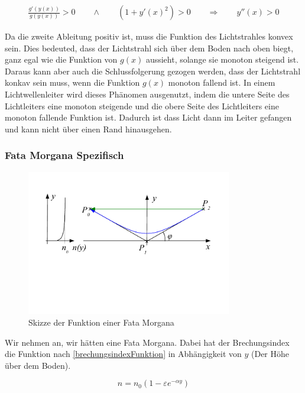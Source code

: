 \begin{align}
\frac{g'(y(x))}{g(y(x))} > 0 \qquad \wedge \qquad (1 + y'(x)^2) > 0 \qquad \Rightarrow \qquad y''(x) > 0
\end{align}

Da die zweite Ableitung positiv ist, muss die Funktion des Lichtstrahles konvex sein.
Dies bedeuted, dass der Lichtstrahl sich über dem Boden nach oben biegt, 
ganz egal wie die Funktion von $g(x)$ aussieht, solange sie monoton steigend ist.
Daraus kann aber auch die Schlussfolgerung gezogen werden, dass der Lichtstrahl konkav sein muss, 
wenn die Funktion $g(x)$ monoton fallend ist. 
In einem Lichtwellenleiter wird dieses Phänomen ausgenutzt, indem die untere Seite des Lichtleiters eine monoton steigende
und die obere Seite des Lichtleiters eine monoton fallende Funktion ist. 
Dadurch ist dass Licht dann im Leiter gefangen und kann nicht über einen Rand hinausgehen.

\subsubsection{Fata Morgana Spezifisch}

\begin{figure}[H]
	\includegraphics[width=0.8\textwidth]{./picture/FataMorgana.pdf}
	\caption{Skizze der Funktion einer Fata Morgana}
	\label{Ab:fata}
\end{figure}


Wir nehmen an, wir hätten eine Fata Morgana. 
Dabei hat der Brechungsindex die Funktion nach \eqref{brechungsindexFunktion} in Abhängigkeit von $y$ 
(Der Höhe über dem Boden).

\begin{equation}
	n = n_0 (1 - \varepsilon e^{- \alpha y})
	\label{brechungsindexFunktion}
\end{equation}

